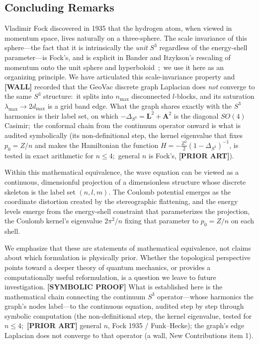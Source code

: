 \documentclass[aps,pra,twocolumn,superscriptaddress,longbibliography]{revtex4-2}
\newcommand{\gvc}[2]{#2}
\begin{document}
\subsection{Concluding Remarks}

Vladimir Fock discovered in 1935 that the hydrogen atom, when viewed in momentum space, lives naturally on a three-sphere. The scale invariance of this sphere---the fact that it is intrinsically the \textit{unit} $S^3$ regardless of the energy-shell parameter---is Fock's, and is explicit in Bander and Itzykson's rescaling of momentum onto the unit sphere and hyperboloid~\cite{bander1966,bander1966b};\ we use it here as an organizing principle. We have articulated this scale-invariance property and \textbf{[WALL]} \gvc{graph-s3-wall}{recorded that the GeoVac discrete graph Laplacian does \emph{not} converge to the same $S^3$ structure:\ it splits into $n_{\max}$ disconnected $l$-blocks, and its saturation $\lambda_{\max}\to 2d_{\max}$ is a grid band edge}.  What the graph shares exactly with the $S^3$ harmonics is their label set, on which $-\Delta_{S^3} = \mathbf{L}^2 + \mathbf{A}^2$ is the diagonal $SO(4)$ Casimir;\ the conformal chain from the continuum operator onward is what is audited symbolically (its non-definitional step, the kernel eigenvalue that fixes $p_0 = Z/n$ and makes the Hamiltonian the function $H = -\tfrac{Z^2}{2}(1-\Delta_{S^3})^{-1}$, is tested in exact arithmetic for $n \le 4$;\ general $n$ is Fock's, \textbf{[PRIOR ART]}).

Within this mathematical equivalence, the wave equation can be viewed as a continuous, dimensionful projection of a dimensionless structure whose discrete skeleton is the label set $(n,l,m)$. The Coulomb potential emerges as the coordinate distortion created by the stereographic flattening, and the energy levels emerge from the energy-shell constraint that parameterizes the projection, the Coulomb kernel's eigenvalue $2\pi^2/n$ fixing that parameter to $p_0 = Z/n$ on each shell.

We emphasize that these are statements of mathematical equivalence, not claims about which formulation is physically prior. Whether the topological perspective points toward a deeper theory of quantum mechanics, or provides a computationally useful reformulation, is a question we leave to future investigation. \textbf{[SYMBOLIC PROOF]} What is established here is the mathematical chain connecting the continuum $S^3$ operator---whose harmonics the graph's nodes label---to the continuous equation, audited step by step through symbolic computation (the non-definitional step, the kernel eigenvalue, tested for $n \le 4$;\ \textbf{[PRIOR ART]} general $n$, Fock 1935 / Funk--Hecke); \gvc{graph-s3-wall}{the graph's edge Laplacian does not converge to that operator (a wall, New Contributions item 1)}.
\end{document}
